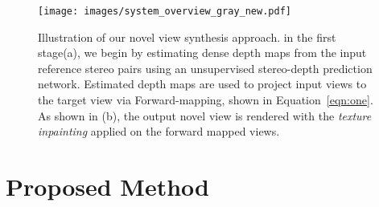 \documentclass[runningheads]{llncs}
\begin{document}

\begin{figure}[htb!]
 
\begin{minipage}[b]{\linewidth}
  \centering
  \texttt{[image: images/system\_overview\_gray\_new.pdf]}
  \caption{Illustration of our novel view synthesis approach. in the first stage(a), we  begin by estimating dense depth maps from the input reference stereo pairs using an unsupervised stereo-depth prediction network. Estimated depth maps are used to project input views to the target view via Forward-mapping, shown in Equation~\ref{eqn:one}. As shown in (b), the output novel view is rendered with the \textit{texture inpainting} applied on the forward mapped views.}
  \label{fig:system}
\end{minipage}

\end{figure}

\section{Proposed Method}
\end{document}
